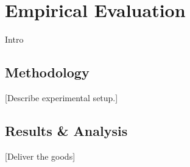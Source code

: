 \chapter{Empirical Evaluation}\label{ch:evaluation}
Intro

\section{Methodology}
[Describe experimental setup.]

\section{Results \& Analysis}
[Deliver the goods]



